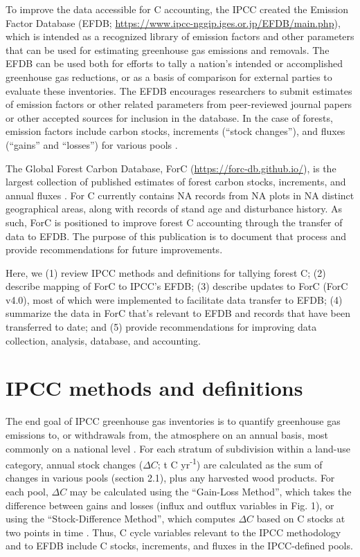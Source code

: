 \documentclass[, manuscript]{copernicus}
\begin{document}
To improve the data accessible for C accounting, the IPCC created the
Emission Factor Database (EFDB;
\url{https://www.ipcc-nggip.iges.or.jp/EFDB/main.php}), which is
intended as a recognized library of emission factors and other
parameters that can be used for estimating greenhouse gas emissions and
removals. The EFDB can be used both for efforts to tally a nation's
intended or accomplished greenhouse gas reductions, or as a basis of
comparison for external parties to evaluate these inventories. The EFDB
encourages researchers to submit estimates of emission factors or other
related parameters from peer-reviewed journal papers or other accepted
sources for inclusion in the database. In the case of forests, emission
factors include carbon stocks, increments (``stock changes''), and
fluxes (``gains'' and ``losses'') for various pools
\citep{ipcc_2006_2006, ipcc_2019_2019}.

The Global Forest Carbon Database, ForC
(\url{https://forc-db.github.io/}), is the largest collection of
published estimates of forest carbon stocks, increments, and annual
fluxes
\citep{anderson-teixeira_forc_2018, anderson-teixeira_carbon_2021}. For
C currently contains NA records from NA plots in NA distinct
geographical areas, along with records of stand age and disturbance
history. As such, ForC is positioned to improve forest C accounting
through the transfer of data to EFDB. The purpose of this publication is
to document that process and provide recommendations for future
improvements.

Here, we (1) review IPCC methods and definitions for tallying forest C;
(2) describe mapping of ForC to IPCC's EFDB; (3) describe updates to
ForC (ForC v4.0), most of which were implemented to facilitate data
transfer to EFDB; (4) summarize the data in ForC that's relevant to EFDB
and records that have been transferred to date; and (5) provide
recommendations for improving data collection, analysis, database, and
accounting.

\section{IPCC methods and definitions}

The end goal of IPCC greenhouse gas inventories is to quantify
greenhouse gas emissions to, or withdrawals from, the atmosphere on an
annual basis, most commonly on a national level
\citep{ipcc_2006_2006, ipcc_2019_2019}. For each stratum of subdivision
within a land-use category, annual stock changes (\(\Delta C\); t C
yr\textsuperscript{-1}) are calculated as the sum of changes in various
pools (section 2.1), plus any harvested wood products. For each pool,
\(\Delta C\) may be calculated using the ``Gain-Loss Method'', which
takes the difference between gains and losses (influx and outflux
variables in Fig. 1), or using the ``Stock-Difference Method'', which
computes \(\Delta C\) based on C stocks at two points in time
\citep{ipcc_2006_2006}. Thus, C cycle variables relevant to the IPCC
methodology and to EFDB include C stocks, increments, and fluxes in the
IPCC-defined pools.
\end{document}

